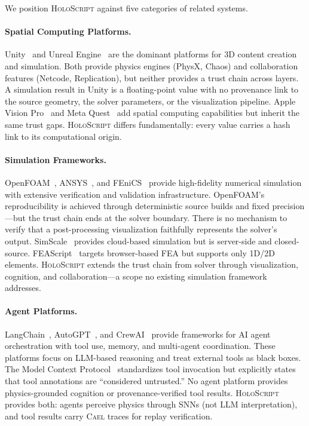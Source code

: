\documentclass[sigchi-a]{acmart}
\newcommand{\holoscript}{\textsc{HoloScript}}
\newcommand{\cael}{\textsc{Cael}}
\begin{document}
We position \holoscript{} against five categories of related systems.

\paragraph{Spatial Computing Platforms.}
Unity~\cite{unity2024} and Unreal Engine~\cite{unreal2024} are the dominant
platforms for 3D content creation and simulation. Both provide physics engines
(PhysX, Chaos) and collaboration features (Netcode, Replication), but neither
provides a trust chain across layers. A simulation result in Unity is a
floating-point value with no provenance link to the source geometry, the
solver parameters, or the visualization pipeline. Apple Vision Pro~\cite{apple-visionpro2024} and Meta Quest~\cite{meta-spatial2025} add spatial computing
capabilities but inherit the same trust gaps.
\holoscript{} differs fundamentally: every value carries a hash link to its
computational origin.

\paragraph{Simulation Frameworks.}
OpenFOAM~\cite{openfoam2024}, ANSYS~\cite{ansys2024}, and
FEniCS~\cite{fenics2024} provide high-fidelity numerical simulation with
extensive verification and validation infrastructure. OpenFOAM's
reproducibility is achieved through deterministic source builds and fixed
precision---but the trust chain ends at the solver boundary. There is no
mechanism to verify that a post-processing visualization faithfully
represents the solver's output. SimScale~\cite{simscale2024} provides
cloud-based simulation but is server-side and closed-source.
FEAScript~\cite{feascript2024} targets browser-based FEA but supports only
1D/2D elements.
\holoscript{} extends the trust chain from solver through visualization,
cognition, and collaboration---a scope no existing simulation framework
addresses.

\paragraph{Agent Platforms.}
LangChain~\cite{langchain2024}, AutoGPT~\cite{autogpt2024}, and
CrewAI~\cite{crewai2024} provide frameworks for AI agent orchestration
with tool use, memory, and multi-agent coordination. These platforms
focus on LLM-based reasoning and treat external tools as black boxes.
The Model Context Protocol~\cite{mcp-spec} standardizes tool invocation
but explicitly states that tool annotations are ``considered
untrusted.'' No agent platform provides physics-grounded cognition or
provenance-verified tool results.
\holoscript{} provides both: agents perceive physics through SNNs
(not LLM interpretation), and tool results carry \cael{} traces for
replay verification.
\end{document}
